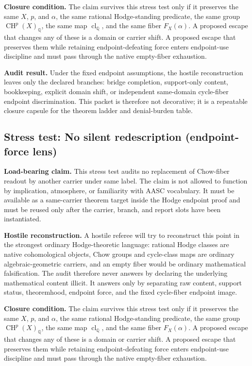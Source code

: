 \documentclass[11pt]{article}
\newcommand{\QQ}{\mathbb{Q}}
\newcommand{\CH}{\operatorname{CH}}
\newcommand{\clQ}{\operatorname{cl}_{\QQ}}
\begin{document}
\par\noindent\textbf{Closure condition.} The claim survives this stress test only if it preserves the same $X$, $p$, and $\alpha$, the same rational Hodge-standing predicate, the same group $\CH^p(X)_\QQ$, the same map $\clQ$, and the same fiber $F_X(\alpha)$. A proposed escape that changes any of these is a domain or carrier shift. A proposed escape that preserves them while retaining endpoint-defeating force enters endpoint-use discipline and must pass through the native empty-fiber exhaustion.

\par\noindent\textbf{Audit result.} Under the fixed endpoint assumptions, the hostile reconstruction leaves only the declared branches: bridge completion, support-only content, bookkeeping, explicit domain shift, or independent same-domain cycle-fiber endpoint discrimination. This packet is therefore not decorative; it is a repeatable closure capsule for the theorem ladder and denial-burden table.


\subsection{Stress test: No silent redescription (endpoint-force lens)}

\par\noindent\textbf{Load-bearing claim.} This stress test audits no replacement of Chow-fiber readout by another carrier under same label. The claim is not allowed to function by implication, atmosphere, or familiarity with AASC vocabulary. It must be available as a same-carrier theorem target inside the Hodge endpoint proof and must be reused only after the carrier, branch, and report slots have been instantiated.

\par\noindent\textbf{Hostile reconstruction.} A hostile referee will try to reconstruct this point in the strongest ordinary Hodge-theoretic language: rational Hodge classes are native cohomological objects, Chow groups and cycle-class maps are ordinary algebraic-geometric carriers, and an empty fiber would be ordinary mathematical falsification. The audit therefore never answers by declaring the underlying mathematical content illicit. It answers only by separating raw content, support status, theoremhood, endpoint force, and the fixed cycle-fiber endpoint image.

\par\noindent\textbf{Closure condition.} The claim survives this stress test only if it preserves the same $X$, $p$, and $\alpha$, the same rational Hodge-standing predicate, the same group $\CH^p(X)_\QQ$, the same map $\clQ$, and the same fiber $F_X(\alpha)$. A proposed escape that changes any of these is a domain or carrier shift. A proposed escape that preserves them while retaining endpoint-defeating force enters endpoint-use discipline and must pass through the native empty-fiber exhaustion.
\end{document}

